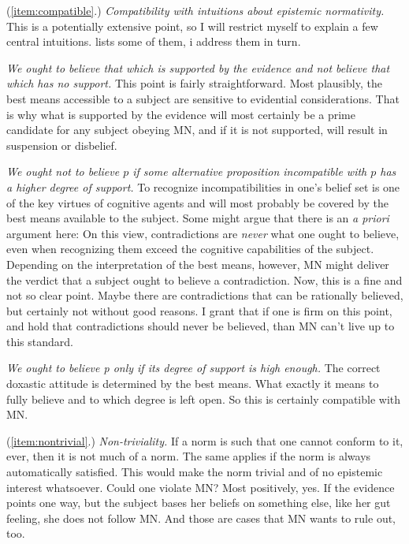 \documentclass[12pt,numbers=noenddot]{scrartcl}
\begin{document}
(\ref{item:compatible}.) \emph{Compatibility with intuitions about epistemic normativity.}
This is a potentially extensive point, so I will restrict myself to explain a few central intuitions. \textcite[39]{Boghossian2003-BOGTNO} lists some of them, i address them in turn.

\emph{We ought to believe that which is supported by the evidence and not believe that which has no support.} This point is fairly straightforward. Most plausibly, the best means accessible to a subject are sensitive to evidential considerations. That is why what is supported by the evidence will most certainly be a prime candidate for any subject obeying MN, and if it is not supported, will result in suspension or disbelief.

\emph{ We ought not to believe $p$ if some alternative proposition incompatible with $p$ has a higher degree of support.} To recognize incompatibilities in one's belief set is one of the key virtues of cognitive agents and will most probably be covered by the best means available to the subject. Some might argue that there is an \emph{a priori} argument here: On this view, contradictions are \emph{never} what one ought to believe, even when recognizing them exceed the cognitive capabilities of the subject. Depending on the interpretation of the best means, however, MN might deliver the verdict that a subject ought to believe a contradiction. Now, this is a fine and not so clear point. Maybe there are contradictions that can be rationally believed, but certainly not without good reasons. I grant that if one is firm on this point, and hold that contradictions should never be believed, than MN can't live up to this standard.

\emph{We ought to believe p only if its degree of support is high enough.} The correct doxastic attitude is determined by the best means. What exactly it means to fully believe and to which degree is left open. So this is certainly compatible with MN.

(\ref{item:nontrivial}.) \emph{Non-triviality.}
If a norm is such that one cannot conform to it, ever, then it is not much of a norm. The same applies if the norm is always automatically satisfied. This would make the norm trivial and of no epistemic interest whatsoever. Could one violate MN? Most positively, yes. If the evidence points one way, but the subject bases her beliefs on something else, like her gut feeling, she does not follow MN. And those are cases that MN wants to rule out, too.
\end{document}
